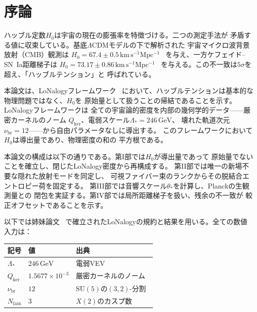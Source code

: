 \documentclass[12pt]{article}
\theoremstyle{plain}
\theoremstyle{definition}
\numberwithin{equation}{section}
\newcommand{\br}{\mathrm{br}}
\newcommand{\kker}{\mathrm{ker}}
\newcommand{\eff}{\mathrm{eff}}
\begin{document}
\begin{titlepage}
\begin{abstract}
基底$\Lambda$CDMベースラインからの$5.8\%$のシフトは、
ダークエネルギー状態方程式（$w+1\sim Q_{\kker}^2\sim 10^{-6}$）
からではなく、PDG 2025の値を$17\%$上回る絶対的真空振幅
$\Lambda_{\eff}=\Lambda_*^4 Q_{\kker}^{20}$から生じることを示す。
SH0ES値との残余$3.4\%$の不一致は、背景膨張の矛盾ではなく、
ケフェイド--SN~Ia距離梯子における$0.074\,\mathrm{mag}$の
較正オフセットに対応する。
\end{abstract}
\end{titlepage}

\setcounter{page}{1}
\tableofcontents
\newpage


\section*{序論}

ハッブル定数$H_0$は宇宙の現在の膨張率を特徴づける。二つの測定手法が
矛盾する値に収束している。基底$\Lambda$CDMモデルの下で解析された
宇宙マイクロ波背景放射（CMB）観測は
$H_0=67.4\pm0.5\,\mathrm{km\,s^{-1}Mpc^{-1}}$~\cite{Planck2018}
を与え、一方ケフェイド--SN~Ia距離梯子は
$H_0=73.17\pm0.86\,\mathrm{km\,s^{-1}Mpc^{-1}}$~\cite{SH0ES2022,Breuval2024}
を与える。この不一致は$5\sigma$を超え、「ハッブルテンション」と
呼ばれている。

本論文は、LoNalogyフレームワーク~\cite{LoNalogyv87,YMmassGap,ParticleCosmo}
において、ハッブルテンションは基本的な物理問題ではなく、$H_0$を
原始量として扱うことの帰結であることを示す。LoNalogyフレームワークは
全ての宇宙論的密度を内部の幾何学的データ——厳密カーネルのノーム
$Q_{\kker}$、電弱スケール$\Lambda_*=246\,\mathrm{GeV}$、
壊れた軌道次元$\nu_{\br}=12$——から自由パラメータなしに導出する。
このフレームワークにおいて$H_0$は導出量であり、物理密度の和の
平方根である。

本論文の構成は以下の通りである。第I部では$H_0$が導出量であって
原始量でないことを確立し、閉じたLoNalogy密度から再構成する。
第II部では唯一の新場不要な隠れた放射モードを同定し、
可視ファイバー束のランクからその脱結合エントロピー荷を固定する。
第III部では音響スケール$\theta_*$を計算し、Planckの生観測量との
閉包を実証する。第IV部では局所距離梯子を扱い、残余の不一致が
較正オフセットであることを示す。

以下では姉妹論文~\cite{YMmassGap,ParticleCosmo,LoNalogyv87}
で確立されたLoNalogyの規約と結果を用いる。全ての数値入力は：
\begin{center}
\begin{tabular}{lll}
\toprule
記号 & 値 & 出典\\
\midrule
$\Lambda_*$ & $246\,\mathrm{GeV}$ & 電弱VEV\\
$Q_{\kker}$ & $1.5677\times10^{-3}$ & 厳密カーネルのノーム~\cite{YMmassGap}\\
$\nu_{\br}$ & $12$ & $\mathrm{SU}(5)$の$(3,2)$-分割~\cite{YMmassGap}\\
$N_{\mathrm{fam}}$ & $3$ & $X(2)$のカスプ数~\cite{YMmassGap}\\
\bottomrule
\end{tabular}
\end{center}
\end{document}
